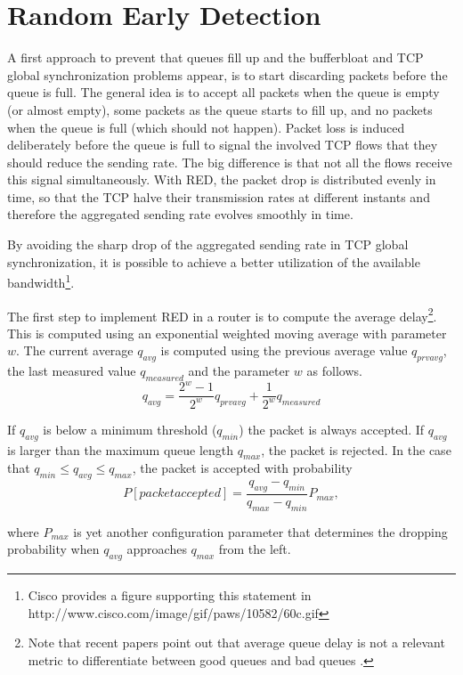 \section{Random Early Detection}

A first approach to prevent that queues fill up and the bufferbloat and TCP global synchronization problems appear, is to start discarding packets before the queue is full.
The general idea is to accept all packets when the queue is empty (or almost empty), some packets as the queue starts to fill up, and no packets when the queue is full (which should not happen).
Packet loss is induced deliberately before the queue is full to signal the involved TCP flows that they should reduce the sending rate.
The big difference is that not all the flows receive this signal simultaneously.
With RED, the packet drop is distributed evenly in time, so that the TCP halve their transmission rates at different instants and therefore the aggregated sending rate evolves smoothly in time.

By avoiding the sharp drop of the aggregated sending rate in TCP global synchronization, it is possible to achieve a better utilization of the available bandwidth\footnote{Cisco provides a figure supporting this statement in http://www.cisco.com/image/gif/paws/10582/60c.gif}.


The first step to implement RED in a router is to compute the average delay\footnote{Note that recent papers point out that average queue delay is not a relevant metric to differentiate between good queues and bad queues \cite{nichols2012cqd}.}.
This is computed using an exponential weighted moving average with parameter $w$.
The current average $q_{avg}$ is computed using the previous average value $q_{prvavg}$, the last measured value $q_{measured}$ and the parameter $w$ as follows.
\begin{equation}
q_{avg} = \frac{2^w-1}{2^w}q_{prvavg} + \frac{1}{2^w}q_{measured}
\end{equation}

If $q_{avg}$ is below a minimum threshold ($q_{min}$) the packet is always accepted.
If $q_{avg}$ is larger than the maximum queue length $q_{max}$, the packet is rejected.
In the case that $q_{min} \leq q_{avg} \leq q_{max}$, the packet is accepted with probability
\begin{equation}
P[packet accepted] = \frac{q_{avg}-q_{min}}{q_{max}-q_{min}}P_{max},
\end{equation}

where $P_{max}$ is yet another configuration parameter that determines the dropping probability when $q_{avg}$ approaches $q_{max}$ from the left.

